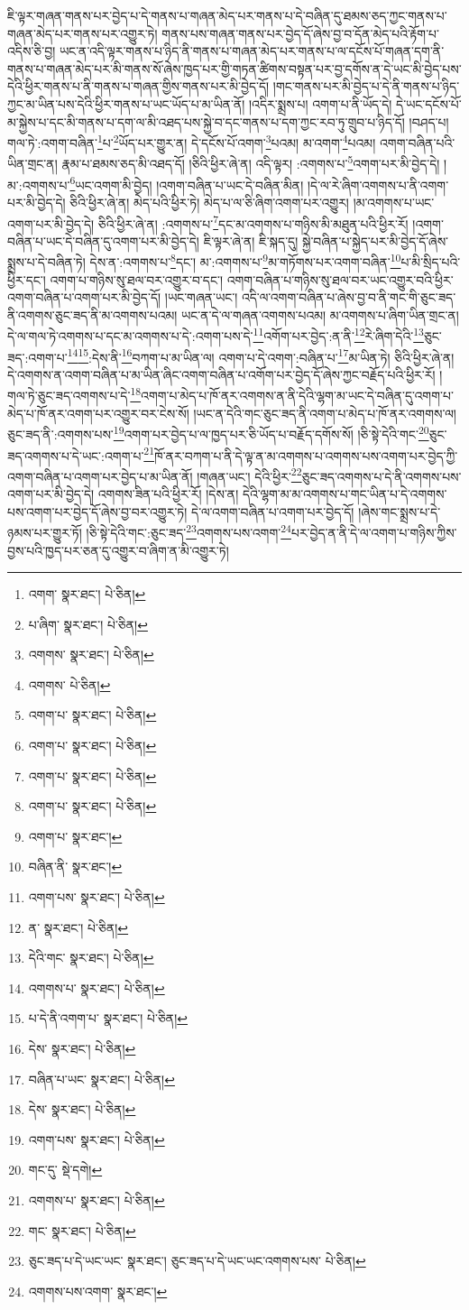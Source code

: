 ཇི་ལྟར་གཞན་གནས་པར་བྱེད་པ་དེ་གནས་པ་གཞན་མེད་པར་གནས་པ་དེ་བཞིན་དུ་ཐམས་ཅད་ཀྱང་གནས་པ་གཞན་མེད་པར་གནས་པར་འགྱུར་ཏེ། གནས་པས་གཞན་གནས་པར་བྱེད་དོ་ཞེས་བྱ་བ་དོན་མེད་པའི་རྟོག་པ་འདིས་ཅི་བྱ། ཡང་ན་འདི་ལྟར་གནས་པ་ཉིད་ནི་གནས་པ་གཞན་མེད་པར་གནས་པ་ལ་དངོས་པོ་གཞན་དག་ནི་གནས་པ་གཞན་མེད་པར་མི་གནས་སོ་ཞེས་ཁྱད་པར་གྱི་གཏན་ཚིགས་བསྟན་པར་བྱ་དགོས་ན་དེ་ཡང་མི་བྱེད་པས་དེའི་ཕྱིར་གནས་པ་ནི་གནས་པ་གཞན་གྱིས་གནས་པར་མི་བྱེད་དོ། །གང་གནས་པར་མི་བྱེད་པ་དེ་ནི་གནས་པ་ཉིད་ཀྱང་མ་ཡིན་པས་དེའི་ཕྱིར་གནས་པ་ཡང་ཡོད་པ་མ་ཡིན་ནོ། །འདིར་སྨྲས་པ། འགག་པ་ནི་ཡོད་དེ། དེ་ཡང་དངོས་པོ་མ་སྐྱེས་པ་དང་མི་གནས་པ་དག་ལ་མི་འཐད་པས་སྐྱེ་བ་དང་གནས་པ་དག་ཀྱང་རབ་ཏུ་གྲུབ་པ་ཉིད་དོ། །བཤད་པ། གལ་ཏེ་:འགག་བཞིན་\footnote{འགག་  སྣར་ཐང་།  པེ་ཅིན། }པ་\footnote{པ་ཞིག་  སྣར་ཐང་།  པེ་ཅིན། }ཡོད་པར་གྱུར་ན། དེ་དངོས་པོ་འགག་\footnote{འགགས་  སྣར་ཐང་།  པེ་ཅིན། }པའམ། མ་འགག་\footnote{འགགས་  པེ་ཅིན། }པའམ། འགག་བཞིན་པའི་ཡིན་གྲང་ན། རྣམ་པ་ཐམས་ཅད་མི་འཐད་དོ། །ཅིའི་ཕྱིར་ཞེ་ན། འདི་ལྟར། :འགགས་པ་\footnote{འགག་པ་  སྣར་ཐང་།  པེ་ཅིན། }འགག་པར་མི་བྱེད་དེ། །མ་:འགགས་པ་\footnote{འགག་པ་  སྣར་ཐང་།  པེ་ཅིན། }ཡང་འགག་མི་བྱེད། །འགག་བཞིན་པ་ཡང་དེ་བཞིན་མིན། །དེ་ལ་རེ་ཞིག་འགགས་པ་ནི་འགག་པར་མི་བྱེད་དེ། ཅིའི་ཕྱིར་ཞེ་ན། མེད་པའི་ཕྱིར་ཏེ། མེད་པ་ལ་ཅི་ཞིག་འགག་པར་འགྱུར། །མ་འགགས་པ་ཡང་འགག་པར་མི་བྱེད་དེ། ཅིའི་ཕྱིར་ཞེ་ན། :འགགས་པ་\footnote{འགག་པ་  སྣར་ཐང་།  པེ་ཅིན། }དང་མ་འགགས་པ་གཉིས་མི་མཐུན་པའི་ཕྱིར་རོ། །འགག་བཞིན་པ་ཡང་དེ་བཞིན་དུ་འགག་པར་མི་བྱེད་དེ། ཇི་ལྟར་ཞེ་ན། ཇི་སྐད་དུ། སྐྱེ་བཞིན་པ་སྐྱེད་པར་མི་བྱེད་དོ་ཞེས་སྨྲས་པ་དེ་བཞིན་ཏེ། དེས་ན་:འགགས་པ་\footnote{འགག་པ་  སྣར་ཐང་།  པེ་ཅིན། }དང་། མ་:འགགས་པ་\footnote{འགག་པ་  སྣར་ཐང་། }མ་གཏོགས་པར་འགག་བཞིན་\footnote{བཞིན་ནི་  སྣར་ཐང་། }པ་མི་སྲིད་པའི་ཕྱིར་དང་། འགག་པ་གཉིས་སུ་ཐལ་བར་འགྱུར་བ་དང་། འགག་བཞིན་པ་གཉིས་སུ་ཐལ་བར་ཡང་འགྱུར་བའི་ཕྱིར་འགག་བཞིན་པ་འགག་པར་མི་བྱེད་དོ། །ཡང་གཞན་ཡང་། འདི་ལ་འགག་བཞིན་པ་ཞེས་བྱ་བ་ནི་གང་གི་ཅུང་ཟད་ནི་འགགས་ཅུང་ཟད་ནི་མ་འགགས་པའམ། ཡང་ན་དེ་ལ་གཞན་འགགས་པའམ། མ་འགགས་པ་ཞིག་ཡིན་གྲང་ན། དེ་ལ་གལ་ཏེ་འགགས་པ་དང་མ་འགགས་པ་དེ་:འགག་པས་དེ་\footnote{འགག་པས་  སྣར་ཐང་།  པེ་ཅིན། }འགོག་པར་བྱེད་:ན་ནི་\footnote{ན་  སྣར་ཐང་།  པེ་ཅིན། }རེ་ཞིག་དེའི་\footnote{དེའི་གང་  སྣར་ཐང་།  པེ་ཅིན། }ཅུང་ཟད་:འགག་པ་\footnote{འགགས་པ་  སྣར་ཐང་།  པེ་ཅིན། }\footnote{པ་དེ་ནི་འགག་པ་  སྣར་ཐང་།  པེ་ཅིན། }:དེས་ནི་\footnote{དེས་  སྣར་ཐང་།  པེ་ཅིན། }བཀག་པ་མ་ཡིན་ལ། འགག་པ་དེ་འགག་:བཞིན་པ་\footnote{བཞིན་པ་ཡང་  སྣར་ཐང་།  པེ་ཅིན། }མ་ཡིན་ཏེ། ཅིའི་ཕྱིར་ཞེ་ན། དེ་འགགས་ན་འགག་བཞིན་པ་མ་ཡིན་ཞིང་འགག་བཞིན་པ་འགོག་པར་བྱེད་དོ་ཞེས་ཀྱང་བརྗོད་པའི་ཕྱིར་རོ། །གལ་ཏེ་ཅུང་ཟད་འགགས་པ་དེ་\footnote{དེས་  སྣར་ཐང་།  པེ་ཅིན། }འགག་པ་མེད་པ་ཁོ་ནར་འགགས་ན་ནི་དེའི་ལྷག་མ་ཡང་དེ་བཞིན་དུ་འགག་པ་མེད་པ་ཁོ་ནར་འགག་པར་འགྱུར་བར་ངེས་སོ། །ཡང་ན་དེའི་གང་ཅུང་ཟད་ནི་འགག་པ་མེད་པ་ཁོ་ནར་འགགས་ལ། ཅུང་ཟད་ནི་:འགགས་པས་\footnote{འགག་པས་  སྣར་ཐང་།  པེ་ཅིན། }འགག་པར་བྱེད་པ་ལ་ཁྱད་པར་ཅི་ཡོད་པ་བརྗོད་དགོས་སོ། །ཅི་སྟེ་དེའི་གང་\footnote{གང་དུ་  སྡེ་དགེ། }ཅུང་ཟད་འགགས་པ་དེ་ཡང་:འགག་པ་\footnote{འགགས་པ་  སྣར་ཐང་།  པེ་ཅིན། }ཁོ་ནར་བཀག་པ་ནི་དེ་ལྟ་ན་མ་འགགས་པ་འགགས་པས་འགག་པར་བྱེད་ཀྱི་འགག་བཞིན་པ་འགག་པར་བྱེད་པ་མ་ཡིན་ནོ། །གཞན་ཡང་། དེའི་ཕྱིར་\footnote{གང་  སྣར་ཐང་།  པེ་ཅིན། }ཅུང་ཟད་འགགས་པ་དེ་ནི་འགགས་པས་འགག་པར་མི་བྱེད་དེ། འགགས་ཟིན་པའི་ཕྱིར་རོ། །དེས་ན། དེའི་ལྷག་མ་མ་འགགས་པ་གང་ཡིན་པ་དེ་འགགས་པས་འགག་པར་བྱེད་དོ་ཞེས་བྱ་བར་འགྱུར་ཏེ། དེ་ལ་འགག་བཞིན་པ་འགག་པར་བྱེད་དོ། །ཞེས་གང་སྨྲས་པ་དེ་ཉམས་པར་གྱུར་ཏོ། །ཅི་སྟེ་དེའི་གང་:ཅུང་ཟད་\footnote{ཅུང་ཟད་པ་དེ་ཡང་ཡང་  སྣར་ཐང་། ཅུང་ཟད་པ་དེ་ཡང་ཡང་འགགས་པས་  པེ་ཅིན། }འགགས་པས་འགག་\footnote{འགགས་པས་འགག་  སྣར་ཐང་། }པར་བྱེད་ན་ནི་དེ་ལ་འགག་པ་གཉིས་ཀྱིས་བྱས་པའི་ཁྱད་པར་ཅན་དུ་འགྱུར་བ་ཞིག་ན་མི་འགྱུར་ཏེ། 